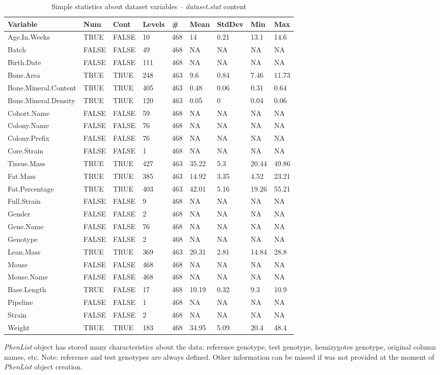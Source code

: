 \documentclass[12pt,a4paper]{article}
\begin{document}
\begin{table}[!h]
\begin{center}
\begin{tabular}{|l|l| l | l | l | l | l | l | l |}
  \hline
Variable&Num&Cont&Levels&\#&Mean&StdDev&Min&Max\\\hline
Age.In.Weeks&TRUE&FALSE&10&468&14&0.21&13.1&14.6\\
Batch&FALSE&FALSE&49&468&NA&NA&NA&NA\\
Birth.Date&FALSE&FALSE&111&468&NA&NA&NA&NA\\
Bone.Area&TRUE&TRUE&248&463&9.6&0.84&7.46&11.73\\
Bone.Mineral.Content&TRUE&TRUE&405&463&0.48&0.06&0.31&0.64\\
Bone.Mineral.Density&TRUE&TRUE&120&463&0.05&0&0.04&0.06\\
Cohort.Name&FALSE&FALSE&59&468&NA&NA&NA&NA\\
Colony.Name&FALSE&FALSE&76&468&NA&NA&NA&NA\\
Colony.Prefix&FALSE&FALSE&76&468&NA&NA&NA&NA\\
Core.Strain&FALSE&FALSE&1&468&NA&NA&NA&NA\\
Tissue.Mass&TRUE&TRUE&427&463&35.22&5.3&20.44&49.86\\
Fat.Mass&TRUE&TRUE&385&463&14.92&3.35&4.52&23.21\\
Fat.Percentage&TRUE&TRUE&403&463&42.01&5.16&19.26&55.21\\
Full.Strain&FALSE&FALSE&9&468&NA&NA&NA&NA\\
Gender&FALSE&FALSE&2&468&NA&NA&NA&NA\\
Gene.Name&FALSE&FALSE&76&468&NA&NA&NA&NA\\
Genotype&FALSE&FALSE&2&468&NA&NA&NA&NA\\
Lean.Mass&TRUE&TRUE&369&463&20.31&2.81&14.84&28.8\\
Mouse&FALSE&FALSE&468&468&NA&NA&NA&NA\\
Mouse.Name&FALSE&FALSE&468&468&NA&NA&NA&NA\\
Base.Length&TRUE&FALSE&17&468&10.19&0.32&9.3&10.9\\
Pipeline&FALSE&FALSE&1&468&NA&NA&NA&NA\\
Strain&FALSE&FALSE&2&468&NA&NA&NA&NA\\
Weight&TRUE&TRUE&183&468&34.95&5.09&20.4&48.4\\
\hline  
\end{tabular}
\caption{Simple statistics about dataset variables -- \textit{dataset.stat} content}\label{table:03}
\end{center}
\end{table}
\textit{PhenList} object has stored many characteristics about the data: reference genotype, test genotype, hemizygotes genotype, original column names, etc.
Note: reference and test genotypes are always defined. Other information can be missed if was not provided at the moment of \textit{PhenList} object creation. 
\end{document}
